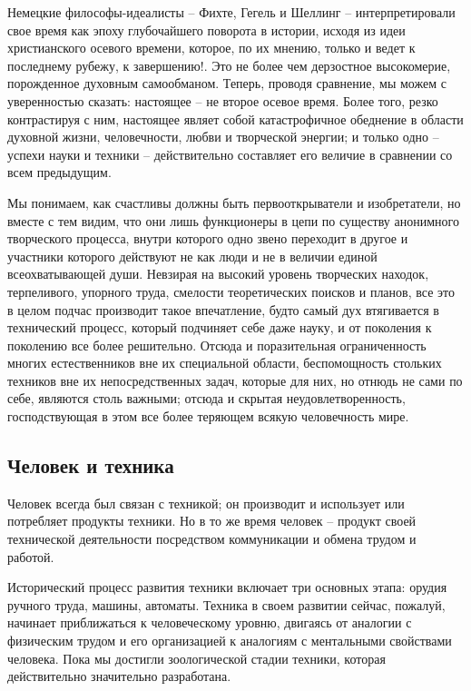 Немецкие философы-идеалисты -- Фихте, Гегель и Шеллинг -- интерпретировали 
свое время как эпоху глубочайшего поворота в истории, исходя из идеи 
христианского осевого времени, которое, по их мнению, только и ведет к 
последнему рубежу, к завершению!. Это не более чем дерзостное высокомерие, 
порожденное духовным самообманом. Теперь, проводя сравнение, мы можем с 
уверенностью сказать: настоящее -- не второе осевое время. Более того, резко 
контрастируя с ним, настоящее являет собой катастрофичное обеднение в области 
духовной жизни, человечности, любви и творческой энергии; и только одно -- 
успехи науки и техники -- действительно составляет его величие в сравнении со 
всем предыдущим. 

Мы понимаем, как счастливы должны быть первооткрыватели и изобретатели, но 
вместе с тем видим, что они лишь функционеры в цепи по существу анонимного 
творческого процесса, внутри которого одно звено переходит в другое и 
участники которого действуют не как люди и не в величии единой всеохватывающей 
души. Невзирая на высокий уровень творческих находок, терпеливого, упорного 
труда, смелости теоретических поисков и планов, все это в целом подчас 
производит такое впечатление, будто самый дух втягивается в технический 
процесс, который подчиняет себе даже науку, и от поколения к поколению все 
более решительно. Отсюда и поразительная ограниченность многих естественников 
вне их специальной области, беспомощность стольких техников вне их 
непосредственных задач, которые для них, но отнюдь не сами по себе, являются 
столь важными; отсюда и скрытая неудовлетворенность, господствующая в этом 
все более теряющем всякую человечность мире.\cite{bib:03}

\subsection{Человек и техника}

Человек всегда был связан с техникой; он производит и использует или 
потребляет продукты техники. Но в то же время человек -- продукт своей 
технической деятельности посредством коммуникации и обмена трудом и работой.

Исторический процесс развития техники включает три основных этапа: орудия 
ручного труда, машины, автоматы. Техника в своем развитии сейчас, пожалуй, 
начинает приближаться к человеческому уровню, двигаясь от аналогии с 
физическим трудом и его организацией к аналогиям с ментальными свойствами 
человека. Пока мы достигли зоологической стадии техники, которая 
действительно значительно разработана.

